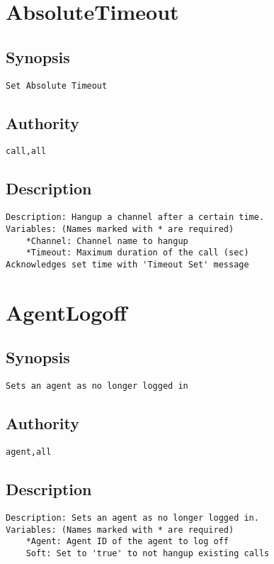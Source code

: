 \section{AbsoluteTimeout}
\subsection{Synopsis}
\begin{verbatim}
Set Absolute Timeout
\end{verbatim}
\subsection{Authority}
\begin{verbatim}
call,all
\end{verbatim}
\subsection{Description}
\begin{verbatim}
Description: Hangup a channel after a certain time.
Variables: (Names marked with * are required)
	*Channel: Channel name to hangup
	*Timeout: Maximum duration of the call (sec)
Acknowledges set time with 'Timeout Set' message

\end{verbatim}


\section{AgentLogoff}
\subsection{Synopsis}
\begin{verbatim}
Sets an agent as no longer logged in
\end{verbatim}
\subsection{Authority}
\begin{verbatim}
agent,all
\end{verbatim}
\subsection{Description}
\begin{verbatim}
Description: Sets an agent as no longer logged in.
Variables: (Names marked with * are required)
	*Agent: Agent ID of the agent to log off
	Soft: Set to 'true' to not hangup existing calls

\end{verbatim}


